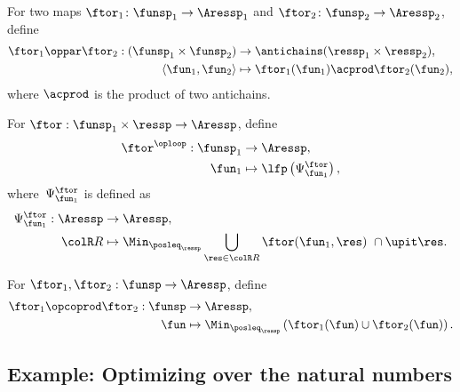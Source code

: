 \begin{definition}
  \label{def:opmaps}
  For two maps $\ftor_{1}\colon\funsp_{1}\rightarrow\Aressp_{1}$
  and $\ftor_{2}\colon\funsp_{2}\rightarrow\Aressp_{2}$, define
  \begin{align}
    \ftor_{1}\oppar\ftor_{2}:(\funsp_{1}\times\funsp_{2}) & \rightarrow\antichains(\ressp_{1}\times\ressp_{2}),\label{eq:oppar}\\
    \left\langle \fun_{1},\fun_{2}\right\rangle  & \mapsto\ftor_{1}(\fun_{1})\acprod\ftor_{2}(\fun_{2}),\nonumber
  \end{align}
  where $\acprod$ is the product of two antichains.
\end{definition}

\begin{definition}
  \label{def:oploop}
  For $\ftor:\funsp_{1}\times\ressp\rightarrow\Aressp$,
  define
  \begin{align}
    \ftor^{\oploop}:\funsp_{1} & \rightarrow\Aressp,\nonumber \\
    \fun_{1} & \mapsto\lfp\left(\Psi_{\fun_{1}}^{\ftor}\right),
  \end{align}
  where~$\Psi_{\fun_{1}}^{\ftor}$ is defined as
  \begin{align}
    \Psi_{\fun_{1}}^{\ftor}:\Aressp & \rightarrow\Aressp,\nonumber \\
    {\colR R} & \mapsto\Min_{\posleq_{\ressp}}\bigcup_{\res\in{\colR R}}\ftor(\fun_{1},\res)\ \cap\upit\res.\label{eq:phi}
  \end{align}
\end{definition}

\begin{definition}
  \label{def:opcoprod}For $\ftor_{1},\ftor_{2}:\funsp\rightarrow\Aressp$,
  define
  \begin{align*}
    \ftor_{1}\opcoprod\ftor_{2}:\funsp & \rightarrow\Aressp,\\
    \fun& \mapsto\Min_{\posleq_{\ressp}}\left(\ftor_{1}(\fun)\cup\ftor_{2}(\fun)\right).
  \end{align*}
\end{definition}

\subsection{Example: Optimizing over the natural numbers}

